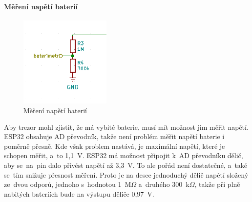 \newpage

\paragraph*{Měření napětí baterií}

\begin{figure}
    \centering
    \includegraphics[width=0.4\textwidth]{kapitoly/obrazky/E4/napajeni/delic_baterimetru.png}
    \caption{Měření napětí baterií\label{fig:E4-baterimetr}}
\end{figure}

Aby trezor mohl zjistit, že má vybité baterie, musí mít možnost jim měřit napětí. ESP32 obsahuje AD převodník, takže není problém měřit napětí baterie 
i poměrně přesně. Kde však problem nastává, je maximální napětí, které je schopen měřit, a~to 1,1~V. ESP32 má možnost připojit k~AD převodníku dělič,
aby se~na~pin dalo přivést napětí až 3,3~V. To ale pořád není dostatečné, a~také se~tím snižuje přesnost měření. Proto je na desce jednoduchý dělič napětí
složený ze~dvou odporů, jednoho s~hodnotou 1~M$\Omega$ a~druhého 300~k$\Omega$, takže při plně nabitých bateriích bude na výstupu děliče 0,97~V. %

\newpage